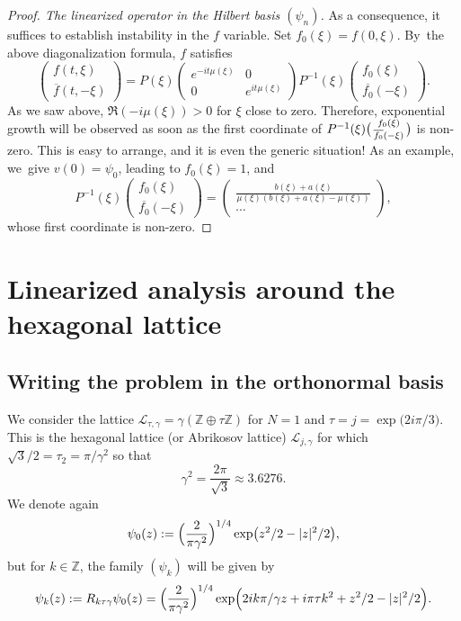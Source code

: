 \documentclass[JEP,XML,SOM,Unicode,NoFloatCountersInSection,published]{cedram}
\newenvironment{smallpmatrix}{\bigl(\begin{smallmatrix}}{\end{smallmatrix}\bigr)}
\theoremstyle{definition}
\let\EE\exp
\newcommand\Z{\mathbb Z}
\begin{document}
\begin{proof}[Proof. The linearized operator in the Hilbert basis $(\psi_n)$]
As a consequence, it suffices to establish instability in the $ {f}$ variable. Set $f_0(\xi)=f(0,\xi)$. By~the above diagonalization formula, $ {f}$ satisfies
\[
\begin{pmatrix} {f}(t,\xi) \\[2pt] \overline{{f}}(t,-\xi) \end{pmatrix} = P(\xi) \begin{pmatrix} e^{-i t \mu(\xi)} & 0 \\[2pt] 0 & e^{i t \mu(\xi)}\end{pmatrix} P^{-1}(\xi) \begin{pmatrix} {f}_0(\xi) \\[2pt] \overline{{f}_0}(-\xi) \end{pmatrix}.
\]
As we saw above, $\Re (-i \mu(\xi)) > 0$ for $\xi$ close to zero. Therefore, exponential growth will be observed as soon as the first coordinate of $P^{-1}(\xi) \begin{smallpmatrix} {f}_0(\xi) \\\overline{{f}_0}(-\xi) \end{smallpmatrix}$ is non-zero. This is easy to arrange, and it is even the generic situation! As an example, we~give $v(0) = \psi_0$, leading to $ {f}_0(\xi) = 1$, and
\[
P^{-1}(\xi) \begin{pmatrix} {f}_0(\xi) \\[2pt] \overline{{f}_0}(-\xi) \end{pmatrix} = \begin{pmatrix}\frac{b(\xi)+a(\xi)}{\mu(\xi)(b(\xi)+a(\xi)-\mu(\xi))} \\[2pt] \cdots \end{pmatrix},
\]
whose first coordinate is non-zero.
\end{proof}

\section{Linearized analysis around the hexagonal lattice}\label{Sect6}
\label{section5}

\subsection{Writing the problem in the orthonormal basis}

\label{subsect6.1}

We consider the lattice $\mathcal{L}_{\tau,\gamma} = \gamma(\Z \oplus \tau \Z)$ for $N=1$ and $\tau = j = \EE\bigl({{2i\pi}/{3}}\bigr)$. This is the hexagonal lattice (or Abrikosov lattice) $\mathcal{L}_{j,\gamma}$ for which ${\sqrt{3}}/{2} = \tau_2 = {\pi}/{\gamma^2}$ so that
\[
\gamma^2 = \frac{2\pi}{\sqrt{3}} \approx 3.6276.
\]
We denote again
\[
\psi_0(z):=\Bigl(\frac{2}{\pi \gamma^2}\Bigr)^{1/4}\EE\bigl({z^2/2-|z|^2/2}\bigr),
\]
but for $k\in \Z$, the family $(\psi_k)$ will be given by
\begin{equation}\label{newdef}
\psi_k(z):=R_{k\tau \gamma}\psi_0(z)=\Bigl(\frac{2}{\pi \gamma^2}\Bigr)^{1/4}\EE\Bigl({{2ik\pi}/ {\gamma} z+i\pi \tau k^2+ z^2/2-|z|^2/2}\Bigr).
\end{equation}
\end{document}
